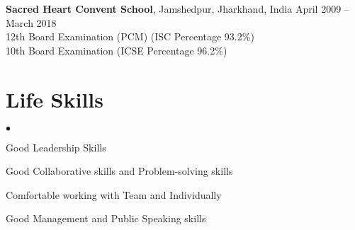\documentclass[margin,line]{res}
\newenvironment{list2}{
  \begin{list}{$\bullet$}{%
      \setlength{\itemsep}{0in}
      \setlength{\parsep}{0in} \setlength{\parskip}{0in}
      \setlength{\topsep}{0in} \setlength{\partopsep}{0in}
      \setlength{\leftmargin}{0.2in}}}{\end{list}}
\begin{document}
\begin{resume}
{\bf Sacred Heart Convent School}, Jamshedpur, Jharkhand, India \hfill April 2009 -- March 2018\\
12th Board Examination (PCM) \hfill(ISC Percentage 93.2\%) \\
10th Board Examination \hfill(ICSE Percentage 96.2\%) \\


\section{\sc Life Skills}
\begin{list2}
  \item Good Leadership Skills
  \item Good Collaborative skills and Problem-solving skills
  \item Comfortable working with Team and Individually
  \item Good Management and Public Speaking skills \\
\end{list2}


\end{resume}
\end{document}
